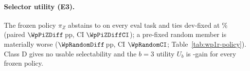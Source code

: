\begin{table}[t]
\centering\small

\caption{\textbf{Common per-task execution budget, offline replay of the
sealed MATH-500 repeats.} Post-execution oracle coverage (best official-
judged outcome, an upper bound requiring an ex-post verifier) of the
dev-ranked panel portfolio versus $b$ of the 27 same-code \bare{}
executions (1,000 seeded subsets; 95\% ranges within $0.3$\,pp). No
cross-arm majority-vote accuracy is reported because the arms use
incompatible answer formats (Appendix~\ref{app:wp1r}).}
\label{tab:budget-curves}
\end{table}

\paragraph{Selector utility (E3).} The frozen policy $\pi_Z$ abstains
to \bare{} on every eval task and ties dev-fixed at \WpBareAcc\%
(paired $\WpPiZDiff$\,pp, CI $\WpPiZDiffCI$); a pre-fixed random member
is materially worse ($\WpRandomDiff$\,pp, CI $\WpRandomCI$;
Table~\ref{tab:wp1r-policy}). Class D gives no usable selectability and
the $b{=}3$ utility $U_b$ is \WpEbZero{}-gain for every frozen policy.
